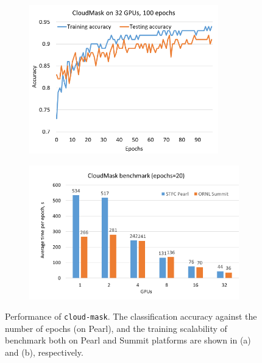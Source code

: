 \begin{figure}[!htb]
\begin{subfigure}{0.43\textwidth}
\centering
\includegraphics[width=0.9\textwidth]{images/cloudmask/image2.png}
\caption{}
\label{fig:cm-scalable-1}
\end{subfigure}
\hfill
\begin{subfigure}{0.57\textwidth}
\centering
\includegraphics[width=0.9\columnwidth]{images/cloudmask/image3.png}
\caption{}
\label{fig:pearl-summit}
\end{subfigure}
\caption{Performance of {\tt cloud-mask}. The classification accuracy against the number of epochs (on Pearl), and  the training scalability of benchmark both on Pearl and Summit platforms are shown in (a) and (b), respectively.}
\end{figure}






